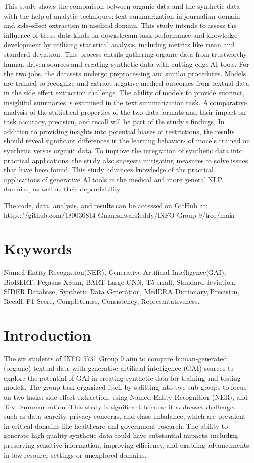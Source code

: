 \documentclass[sigplan,screen]{acmart}
\begin{document}
This study shows the comparison between organic data and the synthetic data with the help of analytic techniques: text summarization in journalism domain and side-effect extraction in medical domain. This study intends to assess the influence of these data kinds on downstream task performance and knowledge development by utilizing statistical analysis, including metrics like mean and standard deviation. This process entails gathering organic data from trustworthy human-driven sources and creating synthetic data with cutting-edge AI tools. For the two jobs, the datasets undergo preprocessing and similar procedures. Models are trained to recognize and extract negative medical outcomes from textual data in the side effect extraction challenge. The ability of models to provide succinct, insightful summaries is examined in the text summarization task. A comparative analysis of the statistical properties of the two data formats and their impact on task accuracy, precision, and recall will be part of the study's findings. In addition to providing insights into potential biases or restrictions, the results should reveal significant differences in the learning behaviors of models trained on synthetic versus organic data. To improve the integration of synthetic data into practical applications, the study also suggests mitigating measures to solve issues that have been found. This study advances knowledge of the practical applications of generative AI tools in the medical and more general NLP domains, as well as their dependability.

The code, data, analysis, and results can be accessed on GitHub at: \url{https://github.com/180030814-GnaneshwarReddy/INFO-Group-9/tree/main}

\section{Keywords}
Named Entity Recognition(NER), Generative Artificial Intelligence(GAI), BioBERT, Pegasus-XSum, BART-Large-CNN, T5-small, Standard deviation, SIDER Database, Synthetic Data Generation, MedDRA Dictionary, Precision, Recall, F1 Score, Completeness, Consistency, Representativeness.

\section{Introduction}

The six students of INFO 5731 Group 9 aim to compare human-generated (organic) textual data with generative artificial intelligence (GAI) sources to explore the potential of GAI in creating synthetic data for training and testing models. The group task organized itself by splitting into two sub-groups to focus on two tasks: side effect extraction, using Named Entity Recognition (NER), and Text Summarization. This study is significant because it addresses challenges such as data scarcity, privacy concerns, and class imbalance, which are prevalent in critical domains like healthcare and government research. The ability to generate high-quality synthetic data could have substantial impacts, including preserving sensitive information, improving efficiency, and enabling advancements in low-resource settings or unexplored domains.
\end{document}
